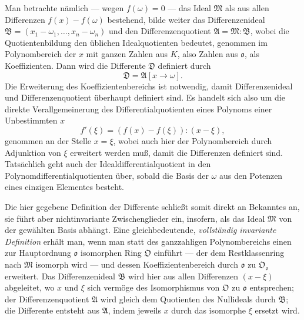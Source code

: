 Man betrachte nämlich --- wegen $f(\omega)=0$ --- das Ideal $\mathfrak M$ als aus allen Differenzen $f(x)-f(\omega)$ bestehend, bilde weiter das Differenzenideal $\mathfrak B=(x_1-\omega_1,\ldots,x_n-\omega_n)$ und den Differenzenquotient $\mathfrak A=\mathfrak M:\mathfrak B$, wobei die Quotientenbildung den üblichen Idealquotienten bedeutet, genommen im Polynombereich der $x$ mit ganzen Zahlen aus $K$, also Zahlen aus $\mathfrak o$, als Koeffizienten. Dann wird die Differente $\mathfrak D$ definiert durch
\[
\mathfrak D=\mathfrak A[x\to\omega].
\]
Die Erweiterung des Koeffizientenbereichs ist notwendig, damit Differenzenideal und Differenzenquotient überhaupt definiert sind. Es handelt sich also um die direkte Verallgemeinerung des Differentialquotienten eines Polynoms einer Unbestimmten $x$
\[
f'(\xi)=(f(x)-f(\xi)):(x-\xi),
\]
genommen an der Stelle $x=\xi$, wobei auch hier der Polynombereich durch Adjunktion von $\xi$ erweitert werden muß, damit die Differenzen definiert sind. Tatsächlich geht auch der Idealdifferentialquotient in den Polynomdifferentialquotienten über, sobald die Basis der $\omega$ aus den Potenzen eines einzigen Elementes besteht.

Die hier gegebene Definition der Differente schließt somit direkt an Bekanntes an, sie führt aber nichtinvariante Zwischenglieder ein, insofern, als das Ideal $\mathfrak M$ von der gewählten Basis abhängt. Eine gleichbedeutende, \emph{vollständig invariante Definition} erhält man, wenn man statt des ganzzahligen Polynombereichs einen zur Hauptordnung $\mathfrak o$ isomorphen Ring $\mathfrak O$ einführt --- der dem Restklassenring nach $\mathfrak M$ isomorph wird --- und dessen Koeffizientenbereich durch $\mathfrak o$ zu $\mathfrak O_{\mathfrak o}$ erweitert. Das Differenzenideal $\mathfrak B$ wird hier aus allen Differenzen $(x-\xi)$ abgeleitet, wo $x$ und $\xi$ sich vermöge des Isomorphismus von $\mathfrak O$ zu $\mathfrak o$ entsprechen; der Differenzenquotient $\mathfrak A$ wird gleich dem Quotienten des Nullideals durch $\mathfrak B$; die Differente entsteht aus $\mathfrak A$, indem jeweils $x$ durch das isomorphe $\xi$ ersetzt wird.

